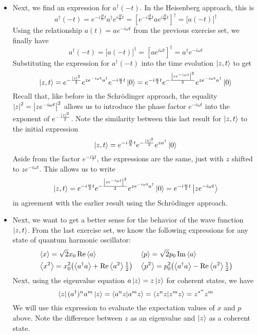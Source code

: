 \documentclass[11pt, a4paper]{article}
\newcommand{\schro}{Schr\"{o}dinger\xspace}
\newcommand{\tev}{e^{-i\frac{H}{\hbar}t}}  %
\newcommand{\tevp}{e^{i\frac{H}{\hbar}t}}  %
\newcommand{\evb}[1]{\big \langle {#1} \big \rangle}  %
\begin{document}
\begin{itemize}
	\item Next, we find an expression for $ a^{\dagger}(-t) $. In the Heisenberg approach, this is
	\begin{equation*}
		a^{\dagger}(-t) = \tev a^{\dagger} \tevp = \left[\tev a \tevp\right]^{\dagger} = \big[a(-t)\big]^{\dagger}
	\end{equation*}
	Using the relationship $ a(t) = ae^{-i\omega t} $ from the previous exercise set, we finally have
	\begin{equation*}
		a^{\dagger}(-t) = \big[a(-t)\big]^{\dagger} = \left[ae^{i\omega t}\right]^{\dagger} = a^{\dagger}e^{-i\omega t}
	\end{equation*}
	Substituting the expression for $  a^{\dagger}(-t)  $ into the time evolution $ \ket{z, t} $ to get
	\begin{equation*}
		\ket{z, t} = e^{-\frac{\abs{z}^{2}}{2}}  e^{ze^{-i\omega t}a^{\dagger}} e^{-i\frac{\omega}{2}t}\ket{0} =  e^{-i\frac{\omega}{2}t} e^{-\frac{\abs{ze^{-i\omega t}}^{2}}{2}} e^{ze^{-i\omega t}a^{\dagger}}\ket{0}
	\end{equation*}
	Recall that, like before in the \schro approach, the equality $ \abs{z}^{2} = \abs{ze^{-i\omega t}}^{2}$ allows us to introduce the phase factor $ e^{-i\omega t} $ into the exponent of $ e^{-\frac{\abs{z}^{2}}{2}} $. Note the similarity between this last result for $ \ket{z, t} $ to the initial expression 
	\begin{equation*}
		\ket{z, t} = \tev e^{-\frac{\abs{z}^{2}}{2}}e^{za^{\dagger}}\ket{0}
	\end{equation*}
	Aside from the factor $ e^{-i\frac{\omega}{2}t} $, the expressions are the same, just with $ z $ shifted to $ ze^{-i\omega t} $. This allows us to write
	\begin{equation*}
		\ket{z, t} =  e^{-i\frac{\omega}{2}t} e^{-\frac{\abs{ze^{-i\omega t}}^{2}}{2}} e^{ze^{-i\omega t}a^{\dagger}}\ket{0} = e^{-i\frac{\omega}{2}t}\ket{ze^{-i\omega t}}
	\end{equation*}
	in agreement with the earlier result using the \schro approach. 
	
	\item Next, we want to get a better sense for the behavior of the wave function $ \ket{z, t} $. From the last exercise set, we know the following expressions for any state of quantum harmonic oscillator:
	\begin{align*}
		&\ev{x} = \sqrt{2}x_{0} \Re \ev{a} && \ev{p} = \sqrt{2} p_{0} \Im \ev{a}\\
		&\ev{x^{2}} = x_{0}^{2}\big(\evb{a^{\dagger}a} + \Re \ev{a^{2}} \tfrac{1}{2}\big) && \ev{p^{2}} = p_{0}^{2}\big(\evb{a^{\dagger}a} - \Re \ev{a^{2}} \tfrac{1}{2}\big)
	\end{align*}
	Next, using the eigenvalue equation $ a \ket{z} = z \ket{z} $ for coherent states, we have
	\begin{equation*}
		\bra{z}(a^{\dagger})^{n}a^{m}\ket{z} = \braket{a^{n}z}{a^{m}z} = \braket{z^{n}z}{z^{m}z} = z^{*^{n}}z^{m}
	\end{equation*}
	We will use this expression to evaluate the expectation values of $ x $ and $ p $ above. Note the difference between $ z $ as an eigenvalue and $ \ket{z} $ as a coherent state.
	

\end{itemize}
\end{document}
